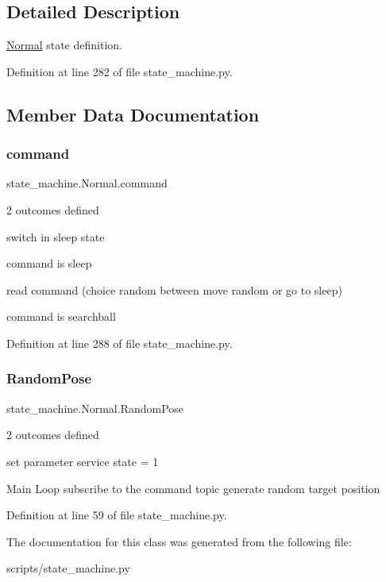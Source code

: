 \subsection{Detailed Description}
\hyperlink{classstate__machine_1_1Normal}{Normal} state definition. 

Definition at line 282 of file state\+\_\+machine.\+py.



\subsection{Member Data Documentation}
\mbox{\label{classstate__machine_1_1Normal_af98201240ec5061a6b82b25758f6f207}} 
\subsubsection{\texorpdfstring{command}{command}}
{\footnotesize\ttfamily state\+\_\+machine.\+Normal.\+command}



2 outcomes defined 

switch in sleep state

command is sleep

read command (choice random between move random or go to sleep)

command is searchball 

Definition at line 288 of file state\+\_\+machine.\+py.

\mbox{\label{classstate__machine_1_1Normal_addf28bcb55a3e1f6bdb118850e164c03}} 
\subsubsection{\texorpdfstring{Random\+Pose}{RandomPose}}
{\footnotesize\ttfamily state\+\_\+machine.\+Normal.\+Random\+Pose}



2 outcomes defined 

set parameter service state = 1

Main Loop subscribe to the command topic generate random target position 

Definition at line 59 of file state\+\_\+machine.\+py.



The documentation for this class was generated from the following file\+:\begin{DoxyCompactItemize}
\item 
scripts/state\+\_\+machine.\+py\end{DoxyCompactItemize}
